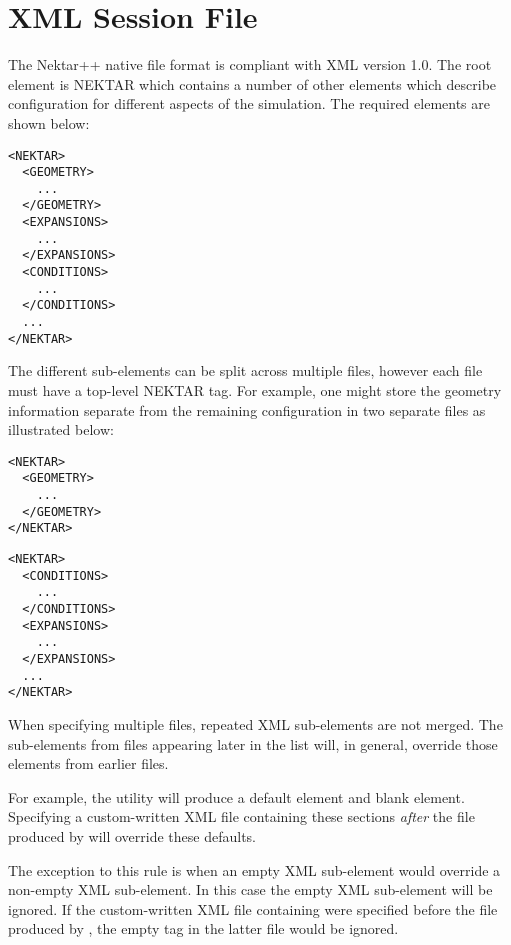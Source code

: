 \chapter{XML Session File}
\label{s:xml}

The Nektar++ native file format is compliant with XML version 1.0. The root
element is NEKTAR which contains a number of other elements which describe
configuration for different aspects of the simulation. The required elements are
shown below:
\begin{lstlisting}[style=XMLStyle]
<NEKTAR>
  <GEOMETRY>
    ...
  </GEOMETRY>
  <EXPANSIONS>
    ...
  </EXPANSIONS>
  <CONDITIONS>
    ...
  </CONDITIONS>
  ...
</NEKTAR>
\end{lstlisting}
The different sub-elements can be split across multiple files, however each
file must have a top-level NEKTAR tag. For example, one might store the
geometry information separate from the remaining configuration in two separate
files as illustrated below:

\begin{lstlisting}[style=XMLStyle]
<NEKTAR>
  <GEOMETRY>
    ...
  </GEOMETRY>
</NEKTAR>
\end{lstlisting}

\begin{lstlisting}[style=XMLStyle]
<NEKTAR>
  <CONDITIONS>
    ...
  </CONDITIONS>
  <EXPANSIONS>
    ...
  </EXPANSIONS>
  ...
</NEKTAR>
\end{lstlisting}

\begin{notebox}
    When specifying multiple files, repeated XML sub-elements are not merged.
    The sub-elements from files appearing later in the list will, in general,
    override those elements from earlier files.
    \medskip
    
    For example, the  utility will produce a default
     element and blank  element. Specifying
    a custom-written XML file containing these sections \emph{after} the
    file produced by  will override these defaults.

    The exception to this rule is when an empty XML sub-element would override a
    non-empty XML sub-element. In this case the empty XML sub-element will be
    ignored. If the custom-written XML file containing  were
    specified before the file produced by , the empty
     tag in the latter file would be ignored.
\end{notebox}












